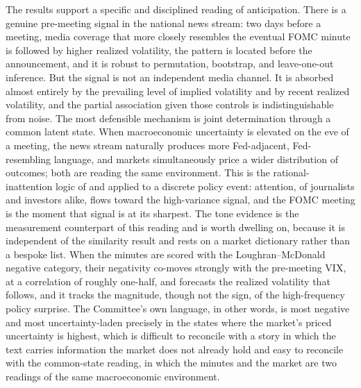 \documentclass[11pt,a4paper]{article}
\begin{document}
The results support a specific and disciplined reading of anticipation. There is a
genuine pre-meeting signal in the national news stream: two days before a meeting,
media coverage that more closely resembles the eventual FOMC minute is followed by
higher realized volatility, the pattern is located before the announcement, and it
is robust to permutation, bootstrap, and leave-one-out inference. But the signal is
not an independent media channel. It is absorbed almost entirely by the prevailing
level of implied volatility and by recent realized volatility, and the partial
association given those controls is indistinguishable from noise. The most
defensible mechanism is joint determination through a common latent state. When
macroeconomic uncertainty is elevated on the eve of a meeting, the news stream
naturally produces more Fed-adjacent, Fed-resembling language, and markets
simultaneously price a wider distribution of outcomes; both are reading the same
environment. This is the rational-inattention logic of
\citet{sims2003implications} and \citet{mackowiak2009optimal} applied to a discrete
policy event: attention, of journalists and investors alike, flows toward the
high-variance signal, and the FOMC meeting is the moment that signal is at its
sharpest. The tone evidence is the measurement counterpart of this reading and is
worth dwelling on, because it is independent of the similarity result and rests on
a market dictionary rather than a bespoke list. When the minutes are scored with
the Loughran--McDonald negative category, their negativity co-moves strongly with
the pre-meeting VIX, at a correlation of roughly one-half, and forecasts the
realized volatility that follows, and it tracks the magnitude, though not the sign,
of the high-frequency policy surprise. The Committee's own language, in other words, is most negative and
most uncertainty-laden precisely in the states where the market's priced
uncertainty is highest, which is difficult to reconcile with a story in which the
text carries information the market does not already hold and easy to reconcile
with the common-state reading, in which the minutes and the market are two
readings of the same macroeconomic environment.
\end{document}

